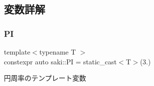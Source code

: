 \subsection{変数詳解}
\mbox{\label{namespacesaki_a1e4c737224df004cb65f178577838f0c}} 
\subsubsection{\texorpdfstring{PI}{PI}}
{\footnotesize\ttfamily template$<$typename T $>$ \\
constexpr auto saki\+::\+PI = static\+\_\+cast$<$T$>$(3.)}



円周率のテンプレート変数 

